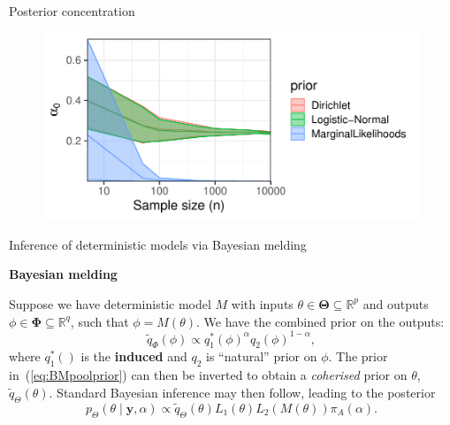 \begin{frame}{Posterior concentration}
 \begin{figure}[!ht]
\begin{center}
\includegraphics[scale=.8]{../../plots/concentration_rates_normal.pdf}
\end{center}
\label{fig:posterior_concentration}
\end{figure}
\end{frame}
\begin{frame}{Inference of deterministic models via Bayesian melding}
\begin{center}
\textbf{Bayesian melding} 
\end{center}
Suppose we have deterministic model $M$ with inputs $\theta \in \boldsymbol\Theta \subseteq \mathbb{R}^p$ and outputs $\phi \in \boldsymbol\Phi\subseteq \mathbb{R}^q$, such that $\phi = M(\theta)$.
We have the combined prior on the outputs:
\begin{equation}
 \label{eq:BMpoolprior}
 \tilde{q}_{\Phi}(\phi) \propto q_1^\ast(\phi)^\alpha q_2(\phi)^{1-\alpha},
\end{equation}
where $q_1^\ast()$ is the \textbf{induced} and $q_2$ is ``natural'' prior on $\phi$.
The prior in~(\ref{eq:BMpoolprior}) can then be inverted to obtain a \textit{coherised} prior on $\theta$, $\tilde{q}_{\Theta}(\theta)$.
Standard Bayesian inference may then follow,  leading to the posterior
\begin{equation}
 \label{eq:BMpoolposterior}
 p_{\Theta}(\theta \mid \boldsymbol y, \alpha) \propto \tilde{q}_{\Theta}(\theta) L_1(\theta) L_2(M(\theta))\pi_A(\alpha).
\end{equation}
\end{frame}

